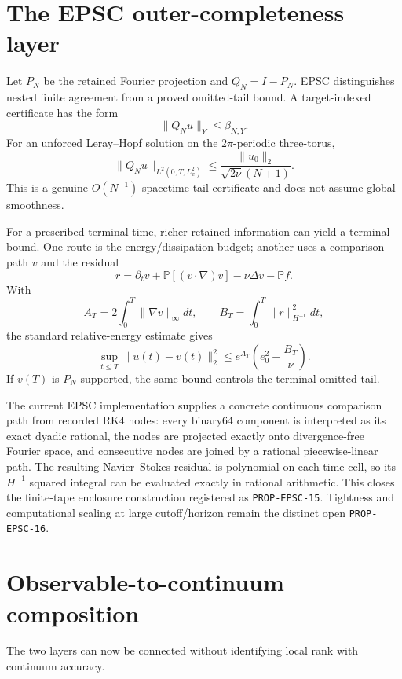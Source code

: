 \documentclass[11pt]{article}
\theoremstyle{definition}
\begin{document}
\section{The EPSC outer-completeness layer}

Let $P_N$ be the retained Fourier projection and $Q_N=I-P_N$.  EPSC distinguishes nested finite
agreement from a proved omitted-tail bound.  A target-indexed certificate has the form
\[
\|Q_Nu\|_Y\le\beta_{N,Y}.
\]
For an unforced Leray--Hopf solution on the $2\pi$-periodic three-torus,
\begin{equation}\label{eq:stbeta}
\boxed{
\|Q_Nu\|_{L^2(0,T;L^2_x)}
\le
\frac{\|u_0\|_2}{\sqrt{2\nu}(N+1)}.
}
\end{equation}
This is a genuine $O(N^{-1})$ spacetime tail certificate and does not assume global smoothness.

For a prescribed terminal time, richer retained information can yield a terminal bound.  One route
is the energy/dissipation budget; another uses a comparison path $v$ and the residual
\[
r=\partial_tv+\mathbb P[(v\cdot\nabla)v]-\nu\Delta v-\mathbb Pf.
\]
With
\[
A_T=2\int_0^T\|\nabla v\|_\infty dt,
\qquad
B_T=\int_0^T\|r\|_{H^{-1}}^2dt,
\]
the standard relative-energy estimate gives
\begin{equation}\label{eq:RE}
\sup_{t\le T}\|u(t)-v(t)\|_2^2
\le e^{A_T}\left(e_0^2+\frac{B_T}{\nu}\right).
\end{equation}
If $v(T)$ is $P_N$-supported, the same bound controls the terminal omitted tail.

The current EPSC implementation supplies a concrete continuous comparison path from recorded RK4
nodes: every binary64 component is interpreted as its exact dyadic rational, the nodes are projected
exactly onto divergence-free Fourier space, and consecutive nodes are joined by a rational
piecewise-linear path.  The resulting Navier--Stokes residual is polynomial on each time cell, so
its $H^{-1}$ squared integral can be evaluated exactly in rational arithmetic.  This closes the
finite-tape enclosure construction registered as \texttt{PROP-EPSC-15}.  Tightness and
computational scaling at large cutoff/horizon remain the distinct open \texttt{PROP-EPSC-16}.

\section{Observable-to-continuum composition}

The two layers can now be connected without identifying local rank with continuum accuracy.
\end{document}
